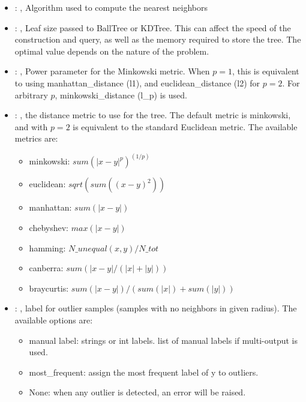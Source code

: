 \begin{itemize}
    \item {}: , 
      Algorithm used to compute the nearest neighbors

    \item {}: , 
      Leaf size passed to BallTree or KDTree. This can affect the speed of the construction
      and query, as well as the memory required to store the tree. The optimal value depends on the
      nature of the problem.

    \item {}: , 
      Power parameter for the Minkowski metric. When $p = 1$, this is equivalent to using
      manhattan\_distance (l1), and euclidean\_distance (l2) for $p = 2$. For arbitrary $p$,
      minkowski\_distance                                                  (l\_p) is used.

    \item {}: , 
      the distance metric to use for the tree. The default metric is minkowski, and with
      $p=2$ is equivalent to the standard Euclidean metric.
      The available metrics are:                                                  \begin{itemize}
      \item minkowski: $sum(|x - y|^p)^(1/p)$
      \item euclidean: $sqrt(sum((x - y)^2))$
      \item manhattan: $sum(|x - y|)$                                                    \item
      chebyshev: $max(|x - y|)$                                                    \item hamming:
      $N\_unequal(x, y) / N\_tot$                                                    \item canberra:
      $sum(|x - y| / (|x| + |y|))$                                                    \item
      braycurtis: $sum(|x - y|) / (sum(|x|) + sum(|y|))$
      \end{itemize}

    \item {}: , 
      label for outlier samples (samples with no neighbors in given radius).
      The available options are:                                                  \begin{itemize}
      \item manual label: strings or int labels. list of manual labels if multi-output is used.
      \item most\_frequent: assign the most frequent label of y to outliers.
      \item None: when any outlier is detected, an error will be raised.
      \end{itemize}
  \end{itemize}


